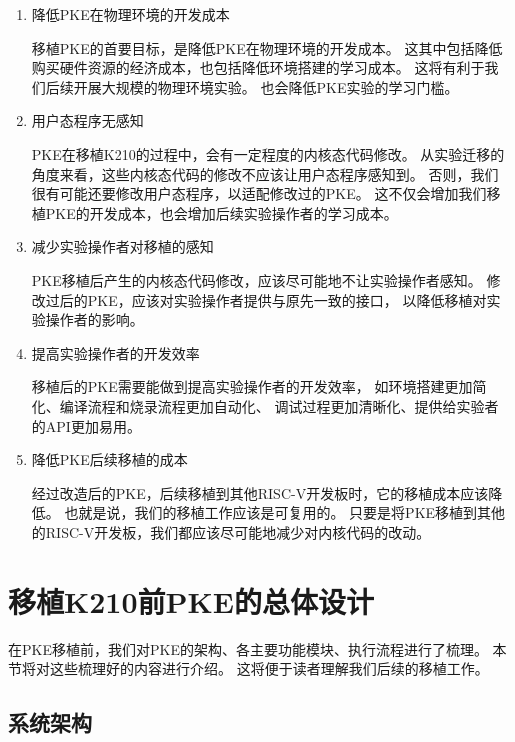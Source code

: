 \begin{enumerate}

    \item 降低PKE在物理环境的开发成本
    
    移植PKE的首要目标，是降低PKE在物理环境的开发成本。
    这其中包括降低购买硬件资源的经济成本，也包括降低环境搭建的学习成本。
    这将有利于我们后续开展大规模的物理环境实验。
    也会降低PKE实验的学习门槛。

    \item 用户态程序无感知
    
    PKE在移植K210的过程中，会有一定程度的内核态代码修改。
    从实验迁移的角度来看，这些内核态代码的修改不应该让用户态程序感知到。
    否则，我们很有可能还要修改用户态程序，以适配修改过的PKE。
    这不仅会增加我们移植PKE的开发成本，也会增加后续实验操作者的学习成本。

    \item 减少实验操作者对移植的感知
    
    PKE移植后产生的内核态代码修改，应该尽可能地不让实验操作者感知。
    修改过后的PKE，应该对实验操作者提供与原先一致的接口，
    以降低移植对实验操作者的影响。

    \item 提高实验操作者的开发效率
    
    移植后的PKE需要能做到提高实验操作者的开发效率，
    如环境搭建更加简化、编译流程和烧录流程更加自动化、
    调试过程更加清晰化、提供给实验者的API更加易用。
    
    \item 降低PKE后续移植的成本

    经过改造后的PKE，后续移植到其他RISC-V开发板时，它的移植成本应该降低。
    也就是说，我们的移植工作应该是可复用的。
    只要是将PKE移植到其他的RISC-V开发板，我们都应该尽可能地减少对内核代码的改动。
    
\end{enumerate}

\section{移植K210前PKE的总体设计}

在PKE移植前，我们对PKE的架构、各主要功能模块、执行流程进行了梳理。
本节将对这些梳理好的内容进行介绍。
这将便于读者理解我们后续的移植工作。

\subsection{系统架构}

